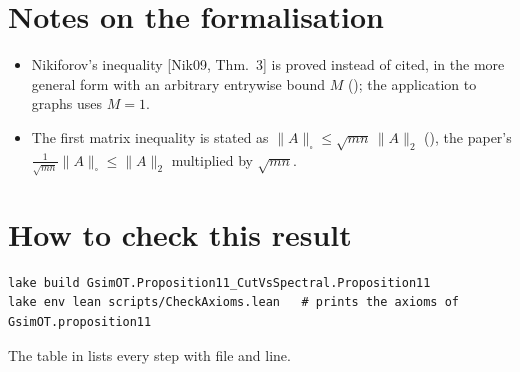 \section{Notes on the formalisation}
\begin{itemize}
\item Nikiforov's inequality [Nik09, Thm.~3] is proved instead of cited, in the more general form with an arbitrary
  entrywise bound $M$ (); the application to graphs uses $M=1$.
\item The first matrix inequality is stated as $\|A\|_\square\le\sqrt{mn}\,\|A\|_2$
  (), the paper's $\frac1{\sqrt{mn}}\|A\|_\square\le\|A\|_2$ multiplied by $\sqrt{mn}$.
\end{itemize}

\section{How to check this result}
\begin{verbatim}
lake build GsimOT.Proposition11_CutVsSpectral.Proposition11
lake env lean scripts/CheckAxioms.lean   # prints the axioms of GsimOT.proposition11
\end{verbatim}
The table in  lists every step with file and line.

